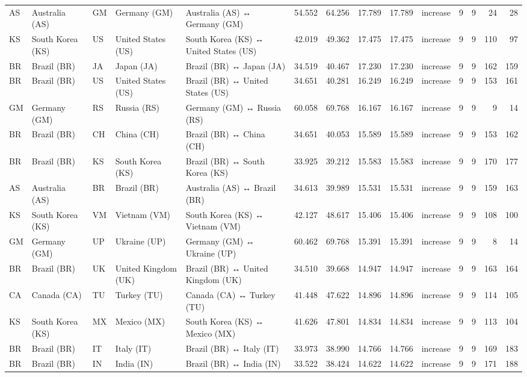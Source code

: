 \begin{tabular}{lllllrrrrlrrrr}
AS & Australia (AS) & GM & Germany (GM) & Australia (AS) ↔ Germany (GM) & 54.552 & 64.256 & 17.789 & 17.789 & increase & 9 & 9 & 24 & 28 \\
KS & South Korea (KS) & US & United States (US) & South Korea (KS) ↔ United States (US) & 42.019 & 49.362 & 17.475 & 17.475 & increase & 9 & 9 & 110 & 97 \\
BR & Brazil (BR) & JA & Japan (JA) & Brazil (BR) ↔ Japan (JA) & 34.519 & 40.467 & 17.230 & 17.230 & increase & 9 & 9 & 162 & 159 \\
BR & Brazil (BR) & US & United States (US) & Brazil (BR) ↔ United States (US) & 34.651 & 40.281 & 16.249 & 16.249 & increase & 9 & 9 & 153 & 161 \\
GM & Germany (GM) & RS & Russia (RS) & Germany (GM) ↔ Russia (RS) & 60.058 & 69.768 & 16.167 & 16.167 & increase & 9 & 9 & 9 & 14 \\
BR & Brazil (BR) & CH & China (CH) & Brazil (BR) ↔ China (CH) & 34.651 & 40.053 & 15.589 & 15.589 & increase & 9 & 9 & 153 & 162 \\
BR & Brazil (BR) & KS & South Korea (KS) & Brazil (BR) ↔ South Korea (KS) & 33.925 & 39.212 & 15.583 & 15.583 & increase & 9 & 9 & 170 & 177 \\
AS & Australia (AS) & BR & Brazil (BR) & Australia (AS) ↔ Brazil (BR) & 34.613 & 39.989 & 15.531 & 15.531 & increase & 9 & 9 & 159 & 163 \\
KS & South Korea (KS) & VM & Vietnam (VM) & South Korea (KS) ↔ Vietnam (VM) & 42.127 & 48.617 & 15.406 & 15.406 & increase & 9 & 9 & 108 & 100 \\
GM & Germany (GM) & UP & Ukraine (UP) & Germany (GM) ↔ Ukraine (UP) & 60.462 & 69.768 & 15.391 & 15.391 & increase & 9 & 9 & 8 & 14 \\
BR & Brazil (BR) & UK & United Kingdom (UK) & Brazil (BR) ↔ United Kingdom (UK) & 34.510 & 39.668 & 14.947 & 14.947 & increase & 9 & 9 & 163 & 164 \\
CA & Canada (CA) & TU & Turkey (TU) & Canada (CA) ↔ Turkey (TU) & 41.448 & 47.622 & 14.896 & 14.896 & increase & 9 & 9 & 114 & 105 \\
KS & South Korea (KS) & MX & Mexico (MX) & South Korea (KS) ↔ Mexico (MX) & 41.626 & 47.801 & 14.834 & 14.834 & increase & 9 & 9 & 113 & 104 \\
BR & Brazil (BR) & IT & Italy (IT) & Brazil (BR) ↔ Italy (IT) & 33.973 & 38.990 & 14.766 & 14.766 & increase & 9 & 9 & 169 & 183 \\
BR & Brazil (BR) & IN & India (IN) & Brazil (BR) ↔ India (IN) & 33.522 & 38.424 & 14.622 & 14.622 & increase & 9 & 9 & 171 & 188 \\

\end{tabular}
